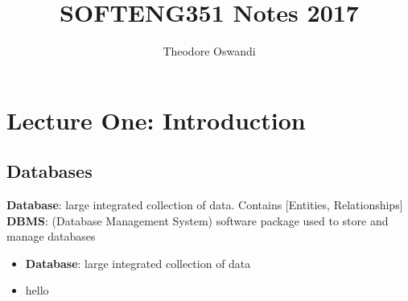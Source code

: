 \documentclass{article}
\title{SOFTENG351 Notes 2017}
\author{Theodore Oswandi}
\begin{document}
 \maketitle{} 

\section{Lecture One: Introduction}
	\subsection{Databases}
		\textbf{Database}: large integrated collection of data. 
		\newline Contains [Entities, Relationships] 
		\newline \newline
		\textbf{DBMS}: (Database Management System)
		\newline software package used to store and manage databases






		\begin{itemize}
			\item \textbf{Database}: large integrated collection of data
			\item hello

		\end{itemize}
\end{document}
